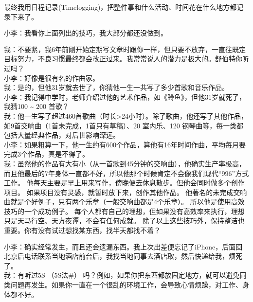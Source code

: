 
最终我用日程记录(Timelogging)，把整件事和什么活动、时间花在什么地方都记录下来了。

小李：我看你上面列出的技巧，我大部分都还没做到。

我：不要紧，我6年前刚开始定期写文章时跟你一样，但只要不放弃，一直往既定目标努力，不良习惯最终都会改正过来。我常常说人的潜力是极大的。舒伯特你听过吗？\\
小李：好像是很有名的作曲家。\\
我：是的，但他31岁就去世了，你猜他一生一共写了多少首歌和音乐作品。\\
小李：我记得中学时，老师介绍过他的艺术作品，如《鳟鱼》，但他31岁就死了，我猜100 \textasciitilde{} 200 首歌？\\
我：他一生写了超过460首歌曲（时长\textgreater{}24小时）。除了歌曲，他还写了其他作品，如9首交响曲（1首未完成，1首只有草稿）、20
室内乐、120 钢琴曲等，每一类都包括大量经典作品，对后世影响深远。\\
小李：如果粗算一下，他一生约有600个作品，算他有16年时间作曲，平均每月要完成3个作品，真是不得了。\\
我：虽然他的作品有大有小（从一首歌到45分钟的交响曲），他确实生产率极高，而且他最后的7年身体一直都不好，所以他那个时候肯定不会像我们现代“996”方式工作。
他每天主要是早上用来写作，傍晚便去休息散步。但他会同时做多个创作项目。
如果项目没有灵感，就暂时放下来，创作其他作品。
他著名的未完成交响曲就是个好例子，只有两个乐章（一般交响曲都是4个乐章）。
所以他是使用高效技巧的一个成功例子。
每个人都有自己的理想，但如果没有高效率来执行，理想只是天马行空、天方夜谭，不会有任何成就。
除了以上这些技巧外，保持整洁也重要。你有没有试过想找某东西，找半天都找不着？

小李：确实经常发生，而且还会遗漏东西。我上次出差便忘记了iPhone，后面回北京后电话联系当地酒店前台后，我找当地同事去酒店取，然后快递给我，烦死了。\\
我：有听过5S （5S法\#）
吗？例如，如果你把东西都放固定地方，就可以避免同类问题再发生。如果你一直在一个很乱的环境工作，会导致心情烦躁，对工作、身体都不好。

\begin{description}
\item[]
\end{description}

